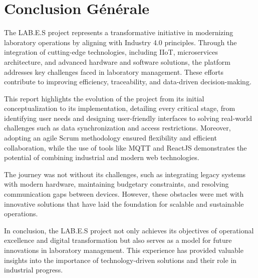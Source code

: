 \chapter{Conclusion Générale}

The LAB.E.S project represents a transformative initiative in modernizing laboratory operations by aligning with Industry 4.0 principles. Through the integration of cutting-edge technologies, including IIoT, microservices architecture, and advanced hardware and software solutions, the platform addresses key challenges faced in laboratory management. These efforts contribute to improving efficiency, traceability, and data-driven decision-making.

This report highlights the evolution of the project from its initial conceptualization to its implementation, detailing every critical stage, from identifying user needs and designing user-friendly interfaces to solving real-world challenges such as data synchronization and access restrictions. Moreover, adopting an agile Scrum methodology ensured flexibility and efficient collaboration, while the use of tools like MQTT and ReactJS demonstrates the potential of combining industrial and modern web technologies.

The journey was not without its challenges, such as integrating legacy systems with modern hardware, maintaining budgetary constraints, and resolving communication gaps between devices. However, these obstacles were met with innovative solutions that have laid the foundation for scalable and sustainable operations.

In conclusion, the LAB.E.S project not only achieves its objectives of operational excellence and digital transformation but also serves as a model for future innovations in laboratory management. This experience has provided valuable insights into the importance of technology-driven solutions and their role in industrial progress.